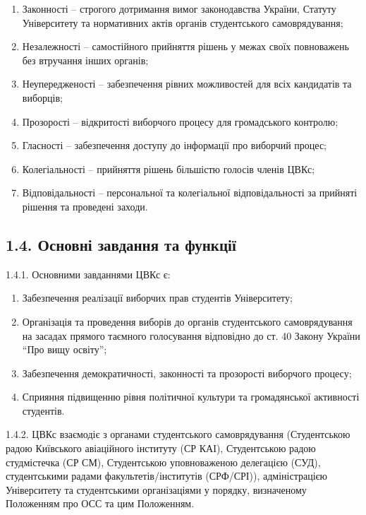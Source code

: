         \begin{enumerate}[label=\alph*)]
            \item Законності -- строгого дотримання вимог законодавства України, Статуту Університету та нормативних актів органів студентського самоврядування;
            \item Незалежності -- самостійного прийняття рішень у межах своїх повноважень без втручання інших органів;
            \item Неупередженості -- забезпечення рівних можливостей для всіх кандидатів та виборців;
            \item Прозорості -- відкритості виборчого процесу для громадського контролю;
            \item Гласності -- забезпечення доступу до інформації про виборчий процес;
            \item Колегіальності -- прийняття рішень більшістю голосів членів ЦВКс;
            \item Відповідальності -- персональної та колегіальної відповідальності за прийняті рішення та проведені заходи.
        \end{enumerate}

\subsection*{1.4. Основні завдання та функції}
    1.4.1. Основними завданнями ЦВКс є:

        \begin{enumerate}[label=\alph*)]
            \item Забезпечення реалізації виборчих прав студентів Університету;
            \item Організація та проведення виборів до органів студентського самоврядування на засадах прямого таємного голосування відповідно до ст. 40 Закону України ``Про вищу освіту'';
            \item Забезпечення демократичності, законності та прозорості виборчого процесу;
            \item Сприяння підвищенню рівня політичної культури та громадянської активності студентів.
        \end{enumerate}

    1.4.2. ЦВКс взаємодіє з органами студентського самоврядування (Студентською радою Київського авіаційного інституту (СР КАІ), Студентською радою студмістечка (СР СМ), Студентською уповноваженою делегацією (СУД), студентськими радами факультетів/інститутів (СРФ/СРІ)), адміністрацією Університету та студентськими організаціями у порядку, визначеному Положенням про ОСС та цим Положенням.

